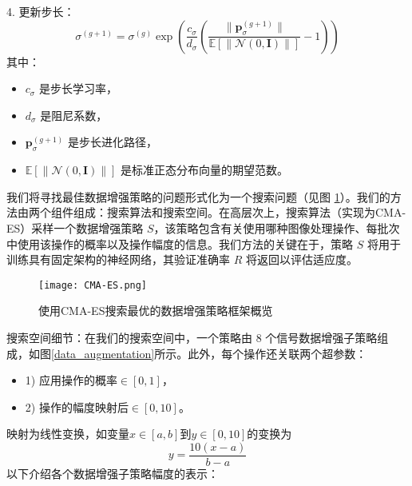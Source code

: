 \documentclass[master]{thesis-uestc}
\begin{document}
4. 更新步长：
\begin{equation}
\sigma^{(g+1)} = \sigma^{(g)} \exp\left(\frac{c_\sigma}{d_\sigma} \left(\frac{\|\mathbf{p}_\sigma^{(g+1)}\|}{\mathbb{E}[\|\mathcal{N}(0, \mathbf{I})\|]} - 1\right)\right)
\label{eq:stepsize_update}
\end{equation}
其中：
\begin{itemize}
    \item \(c_\sigma\) 是步长学习率，
    \item \(d_\sigma\) 是阻尼系数，
    \item \(\mathbf{p}_\sigma^{(g+1)}\) 是步长进化路径，
    \item \(\mathbb{E}[\|\mathcal{N}(0, \mathbf{I})\|]\) 是标准正态分布向量的期望范数。
\end{itemize}

我们将寻找最佳数据增强策略的问题形式化为一个搜索问题（见图 \ref{CMA-ES}）。我们的方法由两个组件组成：搜索算法和搜索空间。在高层次上，搜索算法（实现为CMA-ES）采样一个数据增强策略 \( S \)，该策略包含有关使用哪种图像处理操作、每批次中使用该操作的概率以及操作幅度的信息。我们方法的关键在于，策略 \( S \) 将用于训练具有固定架构的神经网络，其验证准确率 \( R \) 将返回以评估适应度。
\begin{figure}[h]
    \centering
    \texttt{[image: CMA-ES.png]}
    \caption{使用CMA-ES搜索最优的数据增强策略框架概览}
    \label{CMA-ES}
\end{figure}
搜索空间细节：在我们的搜索空间中，一个策略由 8 个信号数据增强子策略组成，如图\ref{data_augmentation}所示。此外，每个操作还关联两个超参数：
\begin{itemize}
    \item 1) 应用操作的概率\(\in [0,1]\)，
    \item 2) 操作的幅度映射后\(\in [0,10]\)。
\end{itemize}
映射为线性变换，如变量\(x \in [a,b]\)到\(y \in [0,10]\)的变换为
\begin{equation}
    y = \frac{10(x - a)}{b - a}
    \end{equation}
以下介绍各个数据增强子策略幅度的表示：
\end{document}
